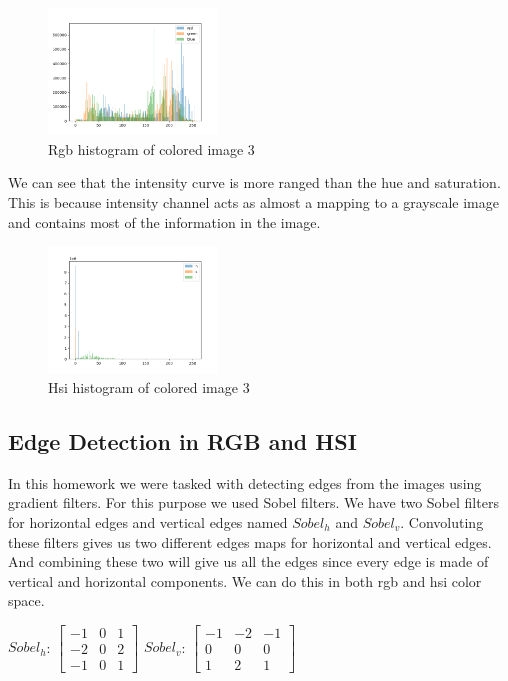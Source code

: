 \documentclass[conference]{IEEEtran}
\begin{document}
\begin{figure}[H]
    \centering
    \includegraphics[width=0.4\textwidth]{resources/3_rgb_histogram.png}
    \caption{Rgb histogram of colored image 3}
    \label{fig:image_3_rgb_histogram}
\end{figure}

We can see that the intensity curve is more ranged than the hue and saturation. This is because intensity channel acts as almost a mapping to a grayscale image and contains most of the information in the image. 

\begin{figure}[H]
    \centering
    \includegraphics[width=0.4\textwidth]{resources/3_hsi_histogram.png}
    \caption{Hsi histogram of colored image 3}
    \label{fig:image_3_hsi_histogram}
\end{figure}

\subsection{Edge Detection in RGB and HSI}
In this homework we were tasked with detecting edges from the images using gradient filters. For this purpose we used Sobel filters. We have two Sobel filters for horizontal edges and vertical edges named $Sobel_h$  and $Sobel_v$. Convoluting these filters gives us two different edges maps for horizontal and vertical edges. And combining these two will give us all the edges since every edge is made of vertical and horizontal components. We can do this in both rgb and hsi color space. 

$Sobel_h$:  
$\begin{bmatrix}
-1 & 0 & 1\\
-2 & 0 & 2\\
-1 & 0 & 1
\end{bmatrix}$
$Sobel_v$:  
$\begin{bmatrix}
-1 & -2 & -1\\
0 & 0 & 0\\
1 & 2 & 1
\end{bmatrix}$
\end{document}
